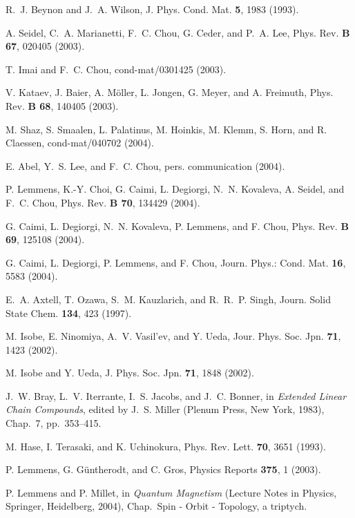 \documentclass[prb,preprint,draft,amsmath,showpacs]{revtex4}
\begin{document}
\begin{thebibliography}{10}

R.~J. Beynon and J.~A. Wilson, J. Phys. Cond. Mat. {\bf 5},  1983  (1993).

A. Seidel, C.~A. Marianetti, F.~C. Chou, G. Ceder, and P.~A. Lee, Phys. Rev.
  {\bf B 67},  020405  (2003).

T. Imai and F.~C. Chou, cond-mat/0301425  (2003).

V. Kataev, J. Baier, A. M{\"o}ller, L. Jongen, G. Meyer, and A. Freimuth, Phys.
  Rev. {\bf B 68},  140405  (2003).

M. Shaz, S. Smaalen, L. Palatinus, M. Hoinkis, M. Klemm, S. Horn, and R.
  Claessen, cond-mat/040702  (2004).

E. Abel, Y.~S. Lee, and F.~C. Chou, pers. communication  (2004).

P. Lemmens, K.-Y. Choi, G. Caimi, L. Degiorgi, N.~N. Kovaleva, A. Seidel, and
  F.~C. Chou, Phys. Rev. {\bf B 70},  134429  (2004).

G. Caimi, L. Degiorgi, N.~N. Kovaleva, P. Lemmens, and F. Chou, Phys. Rev. {\bf
  B 69},  125108  (2004).

G. Caimi, L. Degiorgi, P. Lemmens, and F. Chou, Journ. Phys.: Cond. Mat. {\bf
  16},  5583  (2004).

E.~A. Axtell, T. Ozawa, S.~M. Kauzlarich, and R.~R.~P. Singh, Journ. Solid
  State Chem. {\bf 134},  423  (1997).

M. Isobe, E. Ninomiya, A.~V. Vasil'ev, and Y. Ueda, Jour. Phys. Soc. Jpn. {\bf
  71},  1423  (2002).

M. Isobe and Y. Ueda, J. Phys. Soc. Jpn. {\bf 71},  1848  (2002).

J.~W. Bray, L.~V. Iterrante, I.~S. Jacobs, and J.~C. Bonner,  in {\em Extended
  Linear Chain Compounds}, edited by J.~S. Miller (Plenum Press, New York,
  1983), Chap.~7, pp.\ 353--415.

M. Hase, I. Terasaki, and K. Uchinokura, Phys. Rev. Lett. {\bf 70},  3651
  (1993).

P. Lemmens, G. G{\"u}ntherodt, and C. Gros, Physics Reports {\bf 375},  1
  (2003).

P. Lemmens and P. Millet,  in {\em Quantum Magnetism} (Lecture Notes in
  Physics, Springer, Heidelberg, 2004), Chap.~Spin - Orbit - Topology, a
  triptych.


\end{thebibliography}
\end{document}
